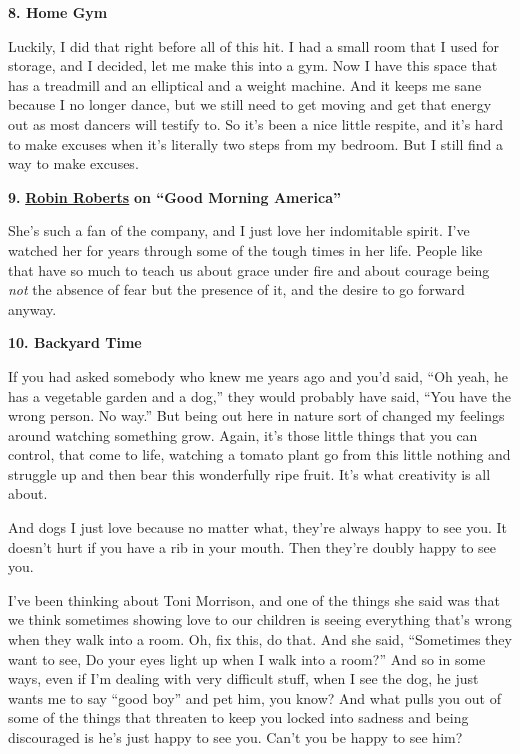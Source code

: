 \textbf{8. Home Gym}

Luckily, I did that right before all of this hit. I had a small room
that I used for storage, and I decided, let me make this into a gym. Now
I have this space that has a treadmill and an elliptical and a weight
machine. And it keeps me sane because I no longer dance, but we still
need to get moving and get that energy out as most dancers will testify
to. So it's been a nice little respite, and it's hard to make excuses
when it's literally two steps from my bedroom. But I still find a way to
make excuses.

\textbf{9.}
\textbf{\href{https://twitter.com/RobinRoberts?ref_src=twsrc\%5Egoogle\%7Ctwcamp\%5Eserp\%7Ctwgr\%5Eauthor}{Robin
Roberts}} \textbf{on ``Good Morning America''}

She's such a fan of the company, and I just love her indomitable spirit.
I've watched her for years through some of the tough times in her life.
People like that have so much to teach us about grace under fire and
about courage being \emph{not} the absence of fear but the presence of
it, and the desire to go forward anyway.

\textbf{10. Backyard Time}

If you had asked somebody who knew me years ago and you'd said, ``Oh
yeah, he has a vegetable garden and a dog,'' they would probably have
said, ``You have the wrong person. No way.'' But being out here in
nature sort of changed my feelings around watching something grow.
Again, it's those little things that you can control, that come to life,
watching a tomato plant go from this little nothing and struggle up and
then bear this wonderfully ripe fruit. It's what creativity is all
about.

And dogs I just love because no matter what, they're always happy to see
you. It doesn't hurt if you have a rib in your mouth. Then they're
doubly happy to see you.

I've been thinking about Toni Morrison, and one of the things she said
was that we think sometimes showing love to our children is seeing
everything that's wrong when they walk into a room. Oh, fix this, do
that. And she said, ``Sometimes they want to see, Do your eyes light up
when I walk into a room?'' And so in some ways, even if I'm dealing with
very difficult stuff, when I see the dog, he just wants me to say ``good
boy'' and pet him, you know? And what pulls you out of some of the
things that threaten to keep you locked into sadness and being
discouraged is he's just happy to see you. Can't you be happy to see
him?

